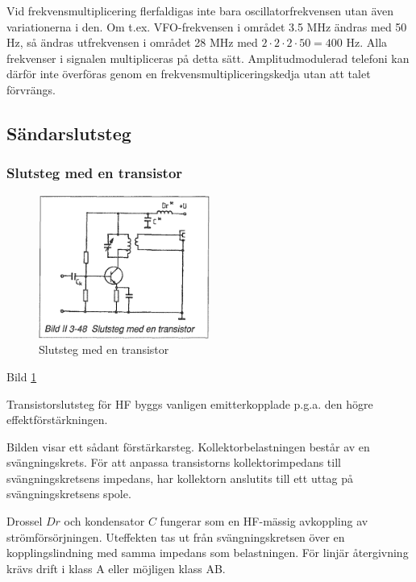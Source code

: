 Vid frekvensmultiplicering flerfaldigas inte bara oscillatorfrekvensen
utan även variationerna i den. Om t.ex. VFO-frekvensen i området 3.5
MHz ändras med 50 Hz, så ändras utfrekvensen i området 28 MHz med \(2
\cdot 2 \cdot 2 \cdot 50 = 400\) Hz. Alla frekvenser i signalen
multipliceras på detta sätt. Amplitudmodulerad telefoni kan därför
inte överföras genom en frekvensmultipliceringskedja utan att talet
förvrängs.

\subsection{Sändarslutsteg}

\subsubsection{Slutsteg med en transistor}

\begin{figure}
\includegraphics[width=0.5\textwidth]{images/bild_2_3-48}
\caption{Slutsteg med en transistor}
\label{fig:BildII3-48}
\end{figure}

Bild \ref{fig:BildII3-48}

Transistorslutsteg för HF byggs vanligen emitterkopplade p.g.a. den
högre effektförstärkningen.

Bilden visar ett sådant förstärkarsteg.  Kollektorbelastningen består
av en svängningskrets. För att anpassa transistorns kollektorimpedans
till svängningskretsens impedans, har kollektorn anslutits till ett
uttag på svängningskretsens spole.

Drossel \(Dr\) och kondensator \(C\) fungerar som en HF-mässig
avkoppling av strömförsörjningen. Uteffekten tas ut från
svängningskretsen över en kopplingslindning med samma impedans som
belastningen. För linjär återgivning krävs drift i klass A eller
möjligen klass AB.

